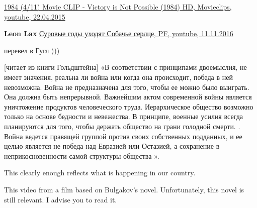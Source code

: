 \begin{itemize}
\href{https://www.youtube.com/watch?v=c0wH6YDfCzg}{%
1984 (4/11) Movie CLIP - Victory is Not Possible (1984) HD, Movieclips, youtube, 22.04.2015%
}

\begin{itemize}
 
\textbf{Leon Lax}
\href{https://youtu.be/OK9n46ZY8JE}{%
Суровые годы уходят Собачье серлце, PF, youtube, 11.11.2016%
}

 

перевел в Гугл )))

[читает из книги Гольдштейна] «В соответствии с принципами двоемыслия, не имеет
значения, реальна ли война или когда она происходит, победа в ней невозможна.
Война не предназначена для того, чтобы ее можно было выиграть. Она должна быть
непрерывной. Важнейшим актом современной войны является уничтожение продуктов
человеческого труда. Иерархическое общество возможно только на основе бедности
и невежества. В принципе, военные усилия всегда планируются для того, чтобы
держать общество на грани голодной смерти. . Война ведется правящей группой
против своих собственных подданных, и ее целью является не победа над Евразией
или Остазией, а сохранение в неприкосновенности самой структуры общества ».


 

This clearly enough reflects what is happening in our country.

This video from a film based on Bulgakov's novel. Unfortunately, this novel is
still relevant. I advise you to read it.

\end{itemize}

 

\end{itemize}
